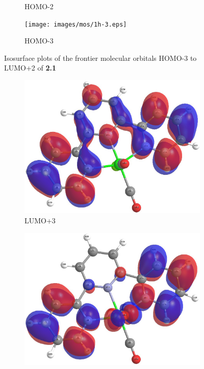 \begin{figure}[!ht]
\begin{subfigure}[b]{0.31\textwidth}
  \caption{HOMO-2}
 \end{subfigure}
 \begin{subfigure}[b]{0.31\textwidth}
  \texttt{[image: images/mos/1h-3.eps]}
  \caption{HOMO-3}
 \end{subfigure}
\caption[Molecular orbitals HOMO-3 to LUMO+2 of \textbf{2.1}]{Isosurface plots of the frontier molecular orbitals HOMO-3 to LUMO+2 of \textbf{2.1}}
\label{fig.mo21}
\end{figure} 

\begin{figure}[!ht]
 \centering
 \begin{subfigure}[b]{0.31\textwidth}
  \includegraphics[clip=true, width=\textwidth, keepaspectratio]{images/mos/2l+3.eps}
  \caption{LUMO+3}
 \end{subfigure}
 \begin{subfigure}[b]{0.31\textwidth}
  \includegraphics[clip=true, width=\textwidth, keepaspectratio]{images/mos/2l+2.eps}

\end{subfigure}
\end{figure}
